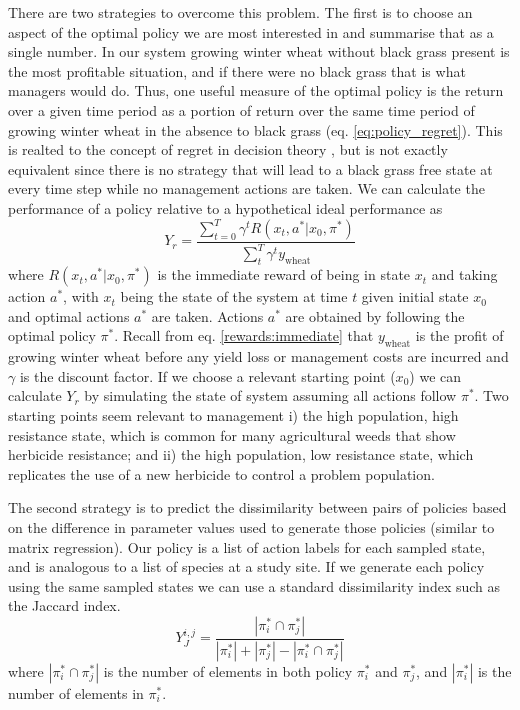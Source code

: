 \documentclass[12pt, a4paper]{article}
\begin{document}
There are two strategies to overcome this problem. The first is to choose an aspect of the optimal policy we are most interested in and summarise that as a single number. In our system growing winter wheat without black grass present is the most profitable situation, and if there were no black grass that is what managers would do. Thus, one useful measure of the optimal policy is the return over a given time period as a portion of return over the same time period of growing winter wheat in the absence to black grass (eq. \ref{eq:policy_regret}). This is realted to the concept of regret in decision theory \citep{Fili2007}, but is not exactly equivalent since there is no strategy that will lead to a black grass free state at every time step while no management actions are taken. We can calculate the performance of a policy relative to a hypothetical ideal performance as   
\begin{equation}\label{eq:policy_regret}
	Y_r = \frac{\sum_{t = 0}^T \gamma^t R(x_t, a^* | x_0, \pi^*)}{\sum_t^T \gamma^t y_{\text{wheat}}}
\end{equation}
where $R(x_t, a^* | x_0, \pi^*)$ is the immediate reward of being in state $x_t$ and taking action $a^*$, with $x_t$ being the state of the system at time $t$ given initial state $x_0$ and optimal actions $a^*$ are taken. Actions $a^*$ are obtained by following the optimal policy $\pi^*$. Recall from eq. \ref{rewards:immediate} that $y_\text{wheat}$ is the profit of growing winter wheat before any yield loss or management costs are incurred and $\gamma$ is the discount factor. If we choose a relevant starting point ($x_0$) we can calculate $Y_r$ by simulating the state of system assuming all actions follow $\pi^*$. Two starting points seem relevant to management i) the high population, high resistance state, which is common for many agricultural weeds that show herbicide resistance; and ii) the high population, low resistance state, which replicates the use of a new herbicide to control a problem population.         

The second strategy is to predict the dissimilarity between pairs of policies based on the difference in parameter values used to generate those policies (similar to matrix regression). Our policy is a list of action labels for each sampled state, and is analogous to a list of species at a study site. If we generate each policy using the same sampled states we can use a standard dissimilarity index such as the Jaccard index. 
\begin{equation}
	Y_J^{i,j} = \frac{|\pi_i^* \cap \pi_j^*|}{|\pi_i^*| + |\pi_j^*| - |\pi_i^* \cap \pi_j^*|}  
\end{equation}
where $|\pi_i^* \cap \pi_j^*|$ is the number of elements in both policy $\pi_i^*$ and $\pi_j^*$, and $|\pi_i^*|$ is the number of elements in $\pi_i^*$.    
\end{document}
